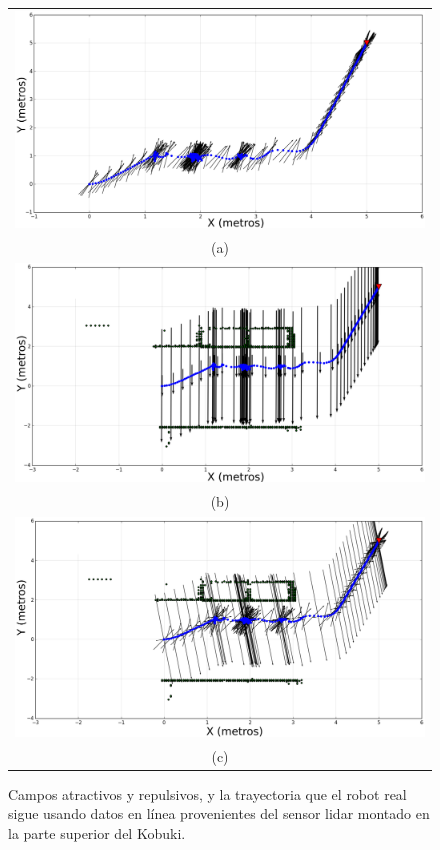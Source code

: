 \begin{figure}%
    \centering
    \begin{tabular}{c}
      \multicolumn{1}{c}{\includegraphics[width=.77\textwidth]{images/fattr_slam.eps}}\\
      \multicolumn{1}{c}{(a)}\\
      \multicolumn{1}{c}{\includegraphics[width=.77\textwidth]{images/frep_slam.eps}}\\
      \multicolumn{1}{c}{(b)}\\
      \multicolumn{1}{c}{\includegraphics[width=.77\textwidth]{images/fnav_slam.eps}}\\
      \multicolumn{1}{c}{(c)}
    \end{tabular}
  \captionsetup{font=footnotesize}
    \caption{\label{fig:Kbki_slam}Campos atractivos y repulsivos, y la trayectoria que el robot real sigue 
    usando datos en línea provenientes del sensor lidar montado en la parte superior del Kobuki.}
\end{figure}

